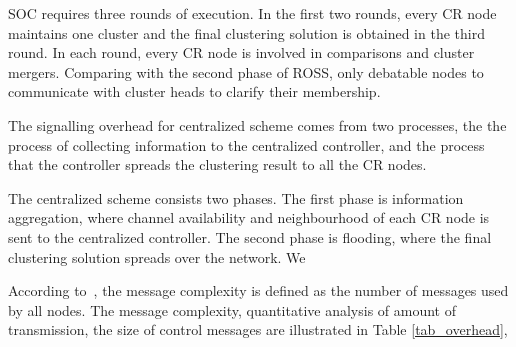 \documentclass[journal,comsoc]{IEEEtran}
\theoremstyle{mytheoremstyle}
\theoremstyle{mytheoremstyle}
\theoremstyle{mytheoremstyle}
\begin{document}
SOC requires three rounds of execution. 
In the first two rounds, every CR node maintains one cluster and the final clustering solution is obtained in the third round. 
In each round, every CR node is involved in comparisons and cluster mergers.
Comparing with the second phase of ROSS, only debatable nodes to communicate with cluster heads to clarify their membership.

The signalling overhead for centralized scheme comes from two processes, the the process of collecting information to the centralized controller, and the process that the controller spreads the clustering result to all the CR nodes.

The centralized scheme consists two phases. 
The first phase is information aggregation, where channel availability and neighbourhood of each CR node is sent to the centralized controller.
The second phase is flooding, where the final clustering solution spreads over the network.
We 




According to~\cite{complexity_aggregation_2011}, the message complexity is defined as the number of messages used by all nodes.
The message complexity, quantitative analysis of amount of transmission, the size of control messages are illustrated in Table \ref{tab_overhead},

\end{document}
